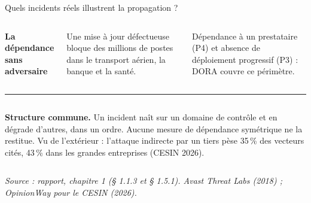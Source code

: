 \documentclass[aspectratio=169,10pt,t]{beamer}
\newcommand{\source}[1]{\par\vfill{\tiny\color{gris}\textit{Source : #1}}\par\vspace{-1mm}}
\begin{document}
\begin{frame}{Quels incidents réels illustrent la propagation ?}
\begin{columns}[T,onlytextwidth]
    {\scriptsize\color{accent}\textbf{La dépendance sans adversaire}}\par\vspace{1mm}
    \footnotesize Une mise à jour défectueuse bloque des millions de postes dans le transport aérien, la banque et la santé.\par\vspace{.8mm}
    {\scriptsize Dépendance à un prestataire (P4) et absence de déploiement progressif (P3) : DORA couvre ce périmètre.\par}
  \end{columns}
  \vspace{1.5mm}
  {\color{filet}\rule{\linewidth}{.35pt}}\par\vspace{1.5mm}
  \begin{columns}[T,onlytextwidth]
    \footnotesize
    \textbf{Structure commune.} Un incident naît sur un domaine de contrôle et en dégrade d'autres, dans un ordre. Aucune mesure de dépendance symétrique ne la restitue.
    \footnotesize
    Vu de l'extérieur : l'attaque indirecte par un tiers pèse 35\,\% des vecteurs cités, 43\,\% dans les grandes entreprises (CESIN 2026).
  \end{columns}
  \source{rapport, chapitre 1 (§ 1.1.3 et § 1.5.1). Avast Threat Labs (2018) ; OpinionWay pour le CESIN (2026).}
\end{frame}
\end{document}
